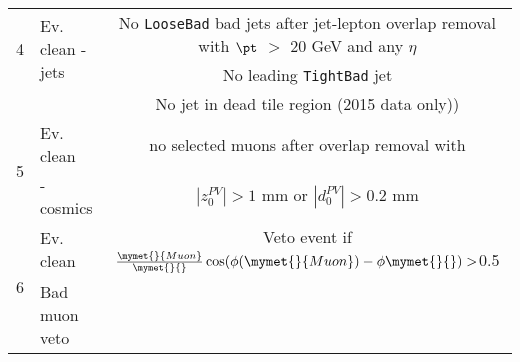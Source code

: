 \begin{table}[htbp]
{\begin{center}
\begin{tabular}{|c|l|c|c|c|c|c|}
\multirow{2}{*}{4}    & \multirow{2}{*}{Ev. clean - jets} & \multicolumn{5}{|c|}{No {\tt LooseBad} bad jets after jet-lepton overlap removal with $\pt$ $>$ 20 GeV and any $\eta$}       \\
                      &                                   & \multicolumn{5}{|c|}{No leading {\tt TightBad} jet}                                                                          \\
                      &                                   & \multicolumn{5}{|c|}{No jet in dead tile region (2015 data only))}                                                           \\ \hline
   \multirow{2}{*}{5} & Ev. clean                         & \multicolumn{5}{|c|}{no selected muons after overlap removal with}                                                           \\
                      & - cosmics                         & \multicolumn{5}{|c|}{ $|z_{0}^{PV}| > 1$ mm or $|d_{0}^{PV}| > 0.2$ mm}                                                      \\ \hline
   \multirow{2}{*}{6} & Ev. clean                         & \multicolumn{5}{|c|}{Veto event if $\frac{\mymet{}{Muon}}{\mymet{}{}}\cos(\phi(\mymet{}{Muon})-\phi\mymet{}{})>$0.5}         \\
                      & Bad muon veto                     & \multicolumn{5}{|c|}{}                                                                                                       \\ \hline



\end{tabular}
\end{center}}
\end{table}
